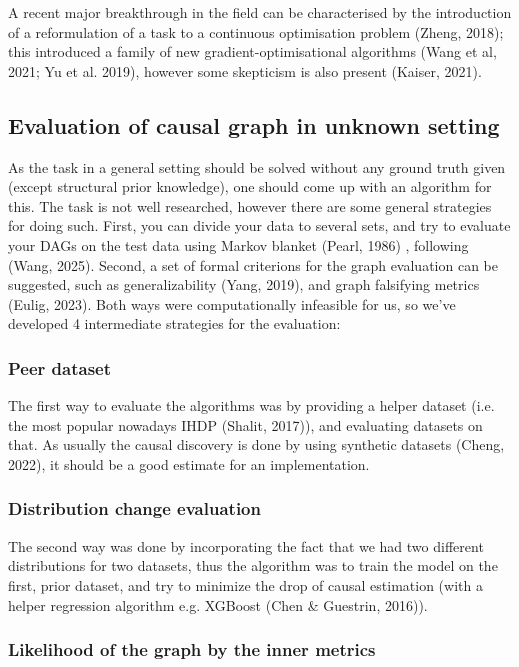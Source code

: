 \documentclass{article}
\begin{document}
	A recent major breakthrough in the field can be characterised by the introduction of a reformulation of a task to a continuous optimisation problem (Zheng, 2018); this introduced a family of new gradient-optimisational algorithms (Wang et al, 2021; Yu et al. 2019), however some skepticism is also present (Kaiser, 2021).
	
	\subsection{Evaluation of causal graph in unknown setting}
	
	As the task in a general setting should be solved without any ground truth given (except structural prior knowledge), one should come up with an algorithm for this. The task is not well researched, however there are some general strategies for doing such. First, you can divide your data to several sets, and try to evaluate your DAGs on the test data using Markov blanket (Pearl, 1986) , following (Wang, 2025). Second, a set of formal criterions for the graph evaluation can be suggested, such as generalizability (Yang, 2019), and graph falsifying metrics (Eulig, 2023). Both ways were computationally infeasible for us, so we've developed 4 intermediate strategies for the evaluation:
	
	\subsubsection{Peer dataset}
	
	The first way to evaluate the algorithms was by providing a helper dataset (i.e. the most popular nowadays IHDP (Shalit, 2017)), and evaluating datasets on that. As usually the causal discovery is done by using synthetic datasets (Cheng, 2022), it should be a good estimate for an implementation.
	
	\subsubsection{Distribution change evaluation}
	
	The second way was done by incorporating the fact that we had two different distributions for two datasets, thus the algorithm was to train the model on the first, prior dataset, and try to minimize the drop of causal estimation (with a helper regression algorithm e.g. XGBoost (Chen \& Guestrin, 2016)). 
	
	\subsubsection{Likelihood of the graph by the inner metrics}
	
\end{document}
